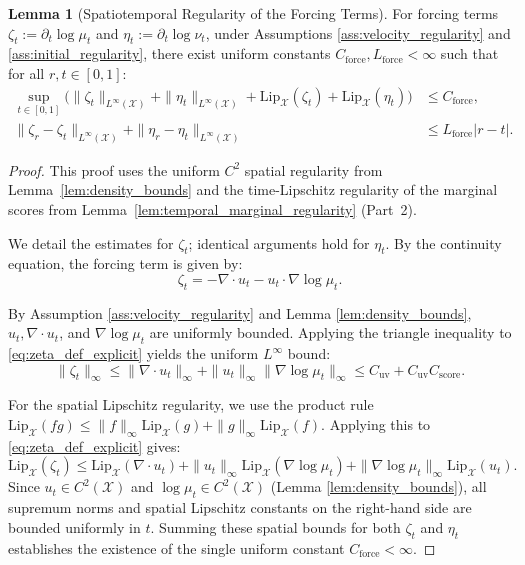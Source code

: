 \documentclass[11pt]{article}
\theoremstyle{definition}
\newtheorem{lemma}[theorem]{Lemma}
\numberwithin{equation}{section}%
\begin{document}
{\begin{lemma}[Spatiotemporal Regularity of the Forcing Terms]
\label{lem:forcing_regularity}
For forcing terms $\zeta_t := \partial_t \log \mu_t$ and $\eta_t := \partial_t \log \nu_t$, under Assumptions \ref{ass:velocity_regularity} and \ref{ass:initial_regularity}, there exist uniform constants $C_{\mathrm{force}}, L_{\mathrm{force}} < \infty$ such that for all $r, t \in [0,1]$:
\begin{align*}
    \sup_{t \in [0,1]} \Big( \|\zeta_t\|_{L^\infty(\mathcal{X})} + \|\eta_t\|_{L^\infty(\mathcal{X})} + \mathrm{Lip}_{\mathcal{X}}(\zeta_t) + \mathrm{Lip}_{\mathcal{X}}(\eta_t) \Big) &\le C_{\mathrm{force}}, \\
    \|\zeta_r - \zeta_t\|_{L^\infty(\mathcal{X})} + \|\eta_r - \eta_t\|_{L^\infty(\mathcal{X})} &\le L_{\mathrm{force}} |r - t|.
\end{align*}
\end{lemma}

\begin{proof}
This proof uses the uniform $C^2$ spatial regularity from Lemma~\ref{lem:density_bounds} and the time-Lipschitz regularity of the marginal scores from Lemma~\ref{lem:temporal_marginal_regularity} (Part~2).

We detail the estimates for $\zeta_t$; identical arguments hold for $\eta_t$. By the continuity equation, the forcing term is given by:
\begin{equation}
\label{eq:zeta_def_explicit}
\zeta_t = -\nabla \cdot u_t - u_t \cdot \nabla \log \mu_t.
\end{equation}

By Assumption \ref{ass:velocity_regularity} and Lemma \ref{lem:density_bounds}, $u_t, \nabla \cdot u_t$, and $\nabla \log \mu_t$ are uniformly bounded. Applying the triangle inequality to \eqref{eq:zeta_def_explicit} yields the uniform $L^\infty$ bound:
\[
\|\zeta_t\|_\infty \le \|\nabla \cdot u_t\|_\infty + \|u_t\|_\infty \|\nabla \log \mu_t\|_\infty \le C_{\mathrm{uv}} + C_{\mathrm{uv}} C_{\mathrm{score}}.
\]

For the spatial Lipschitz regularity, we use the product rule $\mathrm{Lip}_{\mathcal{X}}(fg) \le \|f\|_\infty \mathrm{Lip}_{\mathcal{X}}(g) + \|g\|_\infty \mathrm{Lip}_{\mathcal{X}}(f)$. Applying this to \eqref{eq:zeta_def_explicit} gives:
\[
\mathrm{Lip}_{\mathcal{X}}(\zeta_t) \le \mathrm{Lip}_{\mathcal{X}}(\nabla \cdot u_t) + \|u_t\|_\infty \mathrm{Lip}_{\mathcal{X}}(\nabla \log \mu_t) + \|\nabla \log \mu_t\|_\infty \mathrm{Lip}_{\mathcal{X}}(u_t).
\]
Since $u_t \in C^2(\mathcal{X})$ and $\log \mu_t \in C^2(\mathcal{X})$ (Lemma \ref{lem:density_bounds}), all supremum norms and spatial Lipschitz constants on the right-hand side are bounded uniformly in $t$. Summing these spatial bounds for both $\zeta_t$ and $\eta_t$ establishes the existence of the single uniform constant $C_{\mathrm{force}} < \infty$.


\end{proof}}
\end{document}

